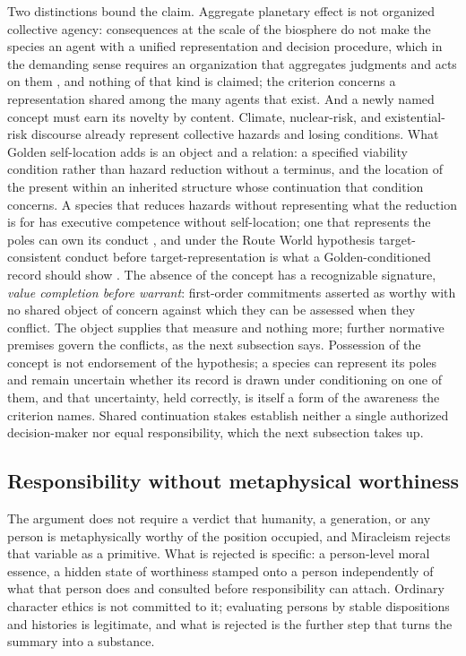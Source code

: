 Two distinctions bound the claim. Aggregate planetary effect is not
organized collective agency: consequences at the scale of the biosphere do
not make the species an agent with a unified representation and decision
procedure, which in the demanding sense requires an organization that
aggregates judgments and acts on them \cite{ListPettit11}, and nothing of
that kind is claimed; the criterion concerns a representation shared among
the many agents that exist. And a newly named concept must earn its novelty
by content. Climate, nuclear-risk, and existential-risk discourse already
represent collective hazards and losing conditions. What Golden self-location
adds is an object and a relation: a specified viability condition rather than
hazard reduction without a terminus, and the location of the present within
an inherited structure whose continuation that condition concerns. A species
that reduces hazards without representing what the reduction is for has
executive competence without self-location; one that represents the poles
can own its conduct \cite{GoldenCivNature}, and under the Route World
hypothesis target-consistent conduct before target-representation is what a
Golden-conditioned record should show \cite{GoldenRouteWorld}. The absence of the concept has a recognizable
signature, \emph{value completion before warrant}: first-order commitments
asserted as worthy with no shared object of concern against which they can be
assessed when they conflict. The object supplies that measure and nothing
more; further normative premises govern the conflicts, as the next subsection
says. Possession of the concept is not endorsement of
the hypothesis; a species can represent its poles and remain uncertain whether
its record is drawn under conditioning on one of them, and that uncertainty,
held correctly, is itself a form of the awareness the criterion names. Shared
continuation stakes establish neither a single authorized decision-maker nor
equal responsibility, which the next subsection takes up.

\subsection*{Responsibility without metaphysical worthiness}

The argument does not require a verdict that humanity, a generation, or any
person is metaphysically worthy of the position occupied, and Miracleism
rejects that variable as a primitive. What is rejected is specific: a
person-level moral essence, a hidden state of worthiness stamped onto a
person independently of what that person does and consulted before
responsibility can attach. Ordinary character ethics is not committed to it;
evaluating persons by stable dispositions and histories is legitimate, and
what is rejected is the further step that turns the summary into a
substance.

